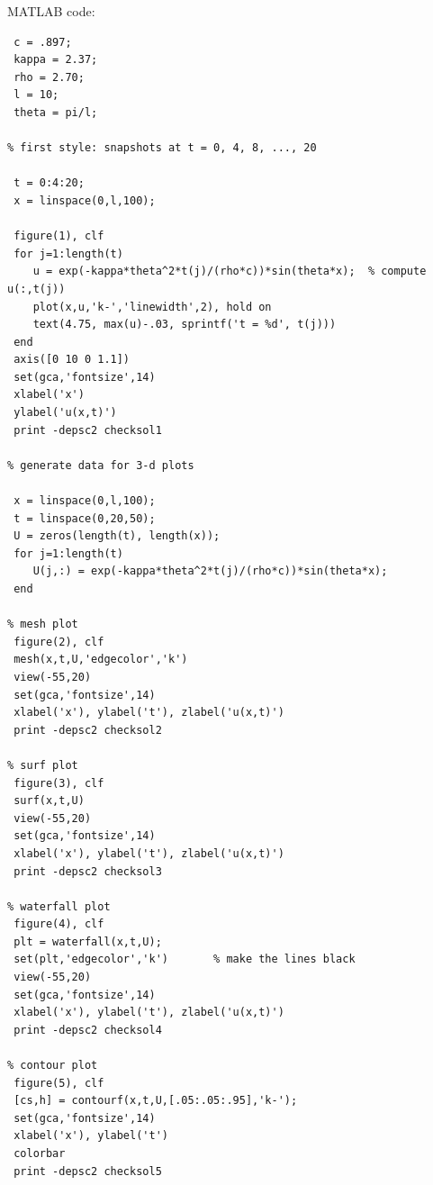 \begin{solution}
\begin{enumerate}
MATLAB code:
{\footnotesize \begin{verbatim}
 c = .897;
 kappa = 2.37;
 rho = 2.70;
 l = 10;
 theta = pi/l;

% first style: snapshots at t = 0, 4, 8, ..., 20

 t = 0:4:20;
 x = linspace(0,l,100);

 figure(1), clf
 for j=1:length(t)
    u = exp(-kappa*theta^2*t(j)/(rho*c))*sin(theta*x);  % compute u(:,t(j))
    plot(x,u,'k-','linewidth',2), hold on
    text(4.75, max(u)-.03, sprintf('t = %d', t(j)))
 end
 axis([0 10 0 1.1])
 set(gca,'fontsize',14)
 xlabel('x')
 ylabel('u(x,t)')
 print -depsc2 checksol1

% generate data for 3-d plots

 x = linspace(0,l,100);
 t = linspace(0,20,50);
 U = zeros(length(t), length(x));
 for j=1:length(t)
    U(j,:) = exp(-kappa*theta^2*t(j)/(rho*c))*sin(theta*x);
 end

% mesh plot
 figure(2), clf
 mesh(x,t,U,'edgecolor','k')
 view(-55,20)
 set(gca,'fontsize',14)
 xlabel('x'), ylabel('t'), zlabel('u(x,t)')
 print -depsc2 checksol2

% surf plot
 figure(3), clf
 surf(x,t,U)
 view(-55,20)
 set(gca,'fontsize',14)
 xlabel('x'), ylabel('t'), zlabel('u(x,t)')
 print -depsc2 checksol3

% waterfall plot
 figure(4), clf
 plt = waterfall(x,t,U);
 set(plt,'edgecolor','k')       % make the lines black
 view(-55,20)
 set(gca,'fontsize',14)
 xlabel('x'), ylabel('t'), zlabel('u(x,t)')
 print -depsc2 checksol4

% contour plot
 figure(5), clf
 [cs,h] = contourf(x,t,U,[.05:.05:.95],'k-');
 set(gca,'fontsize',14)
 xlabel('x'), ylabel('t')
 colorbar 
 print -depsc2 checksol5
\end{verbatim}}
\end{enumerate}
\end{solution}

